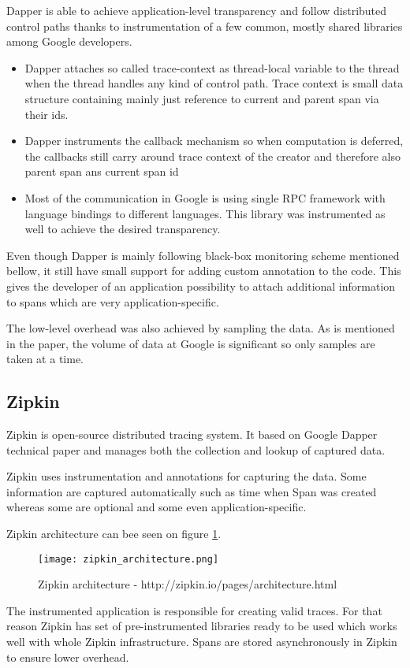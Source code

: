 Dapper is able to achieve application-level transparency and follow distributed control paths thanks to instrumentation of a few common, mostly shared libraries among Google developers. 
\begin{itemize}
	\item Dapper attaches so called trace-context as thread-local variable to the thread when the thread handles any kind of control path. Trace context is small data structure containing mainly just reference to current and parent span via their ids.
	
	\item Dapper instruments the callback mechanism so when computation is deferred, the callbacks still carry around trace context of the creator and therefore also parent span ans current span id
	
	\item Most of the communication in Google is using single RPC framework with language bindings to different languages. This library was instrumented as well to achieve the desired transparency.
\end{itemize}

Even though Dapper is mainly following black-box monitoring scheme mentioned bellow, it still have small support for adding custom annotation to the code. This gives the developer of an application possibility to attach additional information to spans which are very application-specific.

The low-level overhead was also achieved by sampling the data. As is mentioned in the paper, the volume of data at Google is significant so only samples are taken at a time.

\subsection{Zipkin}
Zipkin is open-source distributed tracing system. It based on Google Dapper technical paper and manages both the collection and lookup of captured data.

Zipkin uses instrumentation and annotations for capturing the data. Some
information are captured automatically such as time when Span was created whereas some are optional and some even application-specific.

Zipkin architecture can bee seen on figure \ref{fig:zipkin_architecture}.
\begin{figure}
	\centering
	\texttt{[image: zipkin\_architecture.png]}
	\caption{Zipkin architecture - http://zipkin.io/pages/architecture.html}
	\label{fig:zipkin_architecture}
\end{figure}
The instrumented application is responsible for creating valid traces. For that reason Zipkin has set of pre-instrumented libraries ready to be used which works well with whole Zipkin infrastructure. Spans are stored asynchronously in Zipkin to ensure lower overhead.

